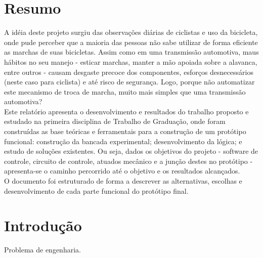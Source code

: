 \documentclass[a4paper,11pt]{article}
\begin{document}



%
\section{Resumo}
\label{sec:resumo}
A idéia deste projeto surgiu das observações diárias de ciclistas e uso da bicicleta, onde pude perceber
que a maioria das pessoas não sabe utilizar de forma eficiente as marchas de suas bicicletas. Assim como
em uma transmissão automotiva, maus hábitos no seu manejo - esticar marchas, manter a mão apoiada sobre a 
alavanca, entre outros - causam desgaste precoce dos componentes, esforços desnecessários (neste caso para
ciclista) e até risco de segurança. Logo, porque não automatizar este mecanismo de troca de marcha, muito 
mais simples que uma transmissão automotiva?
\\
Este relatório apresenta o desenvolvimento e resultados do trabalho proposto e estudado na primeira 
disciplina de Trabalho de Graduação, onde foram construídas as base teóricas e ferramentais para a construção 
de um protótipo funcional: construção da bancada experimental; desenvolvimento da lógica; e estudo de soluções 
existentes. Ou seja, dados os objetivos do projeto - software de controle, circuito de controle, atuados mecânico 
e a junção destes no protótipo - apresenta-se o caminho percorrido até o objetivo e os resultados alcançados.
\\
O documento foi estruturado de forma a descrever as alternativas, escolhas e desenvolvimento de cada parte funcional
do protótipo final.

\pagebreak
%
\section{Introdução}
\label{sec:intro}
Problema de engenharia.
\end{document}
